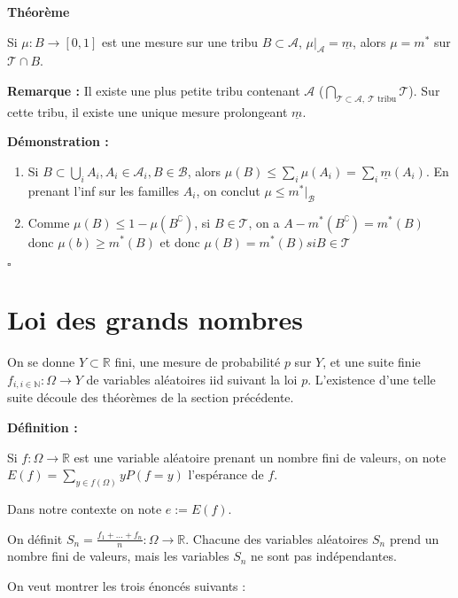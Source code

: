 \documentclass[10pt,a4paper,notitlepage ]{report}
\newcommand{\N}{\mathbb N}
\newcommand{\R}{\mathbb R}
\newcommand{\T}{\mathcal T}
\newcommand{\A}{\mathcal A}
\newcommand{\B}{\mathcal B}
\newcommand{\comp}[1]{#1^\complement}
\newenvironment{definition}{
	
	\textbf{Définition : }
}
{}
\newcounter{th}
\newenvironment{theorem}[1][]{
\refstepcounter{th}
\begin{tcolorbox}
	\textbf{Théorème \theth \ #1}
	
	
}{\end{tcolorbox}}
\newenvironment{demo}[1][]{

	\textbf{Démonstration #1 :}
}{\begin{flushright}
	$\square$
\end{flushright}
}
\newenvironment{rem}{
	
	\textbf{Remarque :}}{}
\begin{document}
\begin{theorem}
	Si $\mu : B \rightarrow [0,1]$ est une mesure sur une tribu $B \subset \A$, $\mu|_\A = \underline m$, alors $\mu=m^*$ sur $\T \cap B$.
\end{theorem}

\begin{rem}
	Il existe une plus petite tribu contenant $\A$ ($\underset{\T \subset \A,\ \T \text{ tribu}}{\bigcap} \T$). Sur cette tribu, il existe une unique mesure prolongeant $\underline m$.
\end{rem}

\begin{demo}
	\begin{enumerate}
		\item Si $B \subset \underset i \bigcup A_i, A_i \in \A_i, B \in \B$, alors $\mu(B) \le \underset i \sum \mu(A_i) = \underset i \sum \underline m(A_i)$. En prenant l'inf sur les familles $A_i$, on conclut $\mu \le m^*|_\B$
		\item Comme $\mu(B) \le 1- \mu(\comp B)$, si $B \in \T$, on a $A-m^*(\comp B) = m^*(B)$ donc $\mu(b) \ge m^*(B)$ et donc $\mu(B) = m^*(B) si B\in \T$
	
	\end{enumerate}
\end{demo}

\section{Loi des grands nombres}

On se donne $Y \subset \R$ fini, une mesure de probabilité $p$ sur $Y$, et une suite finie $f_{i,i\in\N} : \Omega \rightarrow Y$ de variables aléatoires iid suivant la loi $p$. L'existence d'une telle suite découle des théorèmes de la section précédente.

\begin{definition}
	Si $f : \Omega \rightarrow \R$ est une variable aléatoire prenant un nombre fini de valeurs, on note $E(f) = \underset{y \in f(\Omega)} \sum yP(f=y)$ l'espérance de $f$.
\end{definition}

Dans notre contexte on note $e := E(f)$.

On définit $S_n = \frac{f_1 + \dots + f_n} n : \Omega \rightarrow \R$. Chacune des variables aléatoires $S_n$ prend un nombre fini de valeurs, mais les variables $S_n$ ne sont pas indépendantes.

On veut montrer les trois énoncés suivants :
\end{document}
